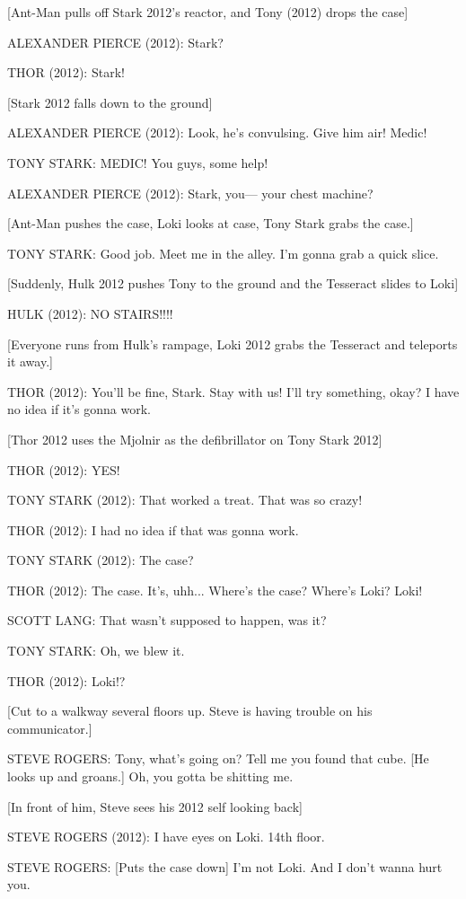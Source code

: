 [Ant-Man pulls off Stark 2012's reactor, and Tony (2012) drops the case]

ALEXANDER PIERCE (2012): Stark?

THOR (2012): Stark!

[Stark 2012 falls down to the ground]

ALEXANDER PIERCE (2012): Look, he's convulsing. Give him air! Medic!

TONY STARK: MEDIC! You guys, some help!

ALEXANDER PIERCE (2012): Stark, you--- your chest machine?

[Ant-Man pushes the case, Loki looks at case, Tony Stark grabs the case.]

TONY STARK: Good job. Meet me in the alley. I'm gonna grab a quick slice.

[Suddenly, Hulk 2012 pushes Tony to the ground and the Tesseract slides to Loki]

HULK (2012): NO STAIRS!!!!

[Everyone runs from Hulk's rampage, Loki 2012 grabs the Tesseract and teleports it away.]

THOR (2012): You'll be fine, Stark. Stay with us! I'll try something, okay? I have no idea if it's gonna work.

[Thor 2012 uses the Mjolnir as the defibrillator on Tony Stark 2012]

THOR (2012): YES!

TONY STARK (2012): That worked a treat. That was so crazy!

THOR (2012): I had no idea if that was gonna work.

TONY STARK (2012): The case?

THOR (2012): The case. It's, uhh... Where's the case? Where's Loki? Loki!

SCOTT LANG: That wasn't supposed to happen, was it?

TONY STARK: Oh, we blew it.

THOR (2012): Loki!?

[Cut to a walkway several floors up. Steve is having trouble on his communicator.]

STEVE ROGERS: Tony, what's going on? Tell me you found that cube. [He looks up and groans.] Oh, you gotta be shitting me.

[In front of him, Steve sees his 2012 self looking back]

STEVE ROGERS (2012): I have eyes on Loki. 14th floor.

STEVE ROGERS: [Puts the case down] I'm not Loki. And I don't wanna hurt you.

